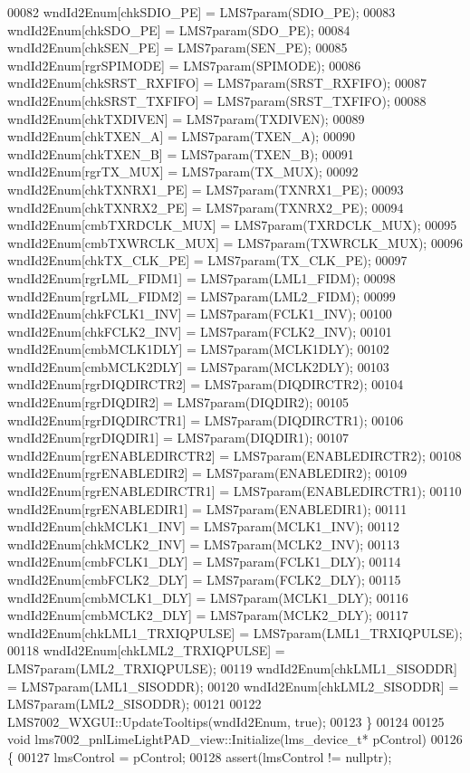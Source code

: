 \begin{DoxyCode}
00082     wndId2Enum[chkSDIO_PE] = LMS7param(SDIO_PE);
00083     wndId2Enum[chkSDO_PE] = LMS7param(SDO_PE);
00084     wndId2Enum[chkSEN_PE] = LMS7param(SEN_PE);
00085     wndId2Enum[rgrSPIMODE] = LMS7param(SPIMODE);
00086     wndId2Enum[chkSRST_RXFIFO] = LMS7param(SRST_RXFIFO);
00087     wndId2Enum[chkSRST_TXFIFO] = LMS7param(SRST_TXFIFO);
00088     wndId2Enum[chkTXDIVEN] = LMS7param(TXDIVEN);
00089     wndId2Enum[chkTXEN_A] = LMS7param(TXEN_A);
00090     wndId2Enum[chkTXEN_B] = LMS7param(TXEN_B);
00091     wndId2Enum[rgrTX_MUX] = LMS7param(TX_MUX);
00092     wndId2Enum[chkTXNRX1_PE] = LMS7param(TXNRX1_PE);
00093     wndId2Enum[chkTXNRX2_PE] = LMS7param(TXNRX2_PE);
00094     wndId2Enum[cmbTXRDCLK_MUX] = LMS7param(TXRDCLK_MUX);
00095     wndId2Enum[cmbTXWRCLK_MUX] = LMS7param(TXWRCLK_MUX);
00096     wndId2Enum[chkTX_CLK_PE] = LMS7param(TX_CLK_PE);
00097     wndId2Enum[rgrLML_FIDM1] = LMS7param(LML1_FIDM);
00098     wndId2Enum[rgrLML_FIDM2] = LMS7param(LML2_FIDM);
00099     wndId2Enum[chkFCLK1_INV] = LMS7param(FCLK1_INV);
00100     wndId2Enum[chkFCLK2_INV] = LMS7param(FCLK2_INV);
00101     wndId2Enum[cmbMCLK1DLY] = LMS7param(MCLK1DLY);
00102     wndId2Enum[cmbMCLK2DLY] = LMS7param(MCLK2DLY);
00103     wndId2Enum[rgrDIQDIRCTR2] = LMS7param(DIQDIRCTR2);
00104     wndId2Enum[rgrDIQDIR2] = LMS7param(DIQDIR2);
00105     wndId2Enum[rgrDIQDIRCTR1] = LMS7param(DIQDIRCTR1);
00106     wndId2Enum[rgrDIQDIR1] = LMS7param(DIQDIR1);
00107     wndId2Enum[rgrENABLEDIRCTR2] = LMS7param(ENABLEDIRCTR2);
00108     wndId2Enum[rgrENABLEDIR2] = LMS7param(ENABLEDIR2);
00109     wndId2Enum[rgrENABLEDIRCTR1] = LMS7param(ENABLEDIRCTR1);
00110     wndId2Enum[rgrENABLEDIR1] = LMS7param(ENABLEDIR1);
00111     wndId2Enum[chkMCLK1_INV] = LMS7param(MCLK1\_INV);
00112     wndId2Enum[chkMCLK2_INV] = LMS7param(MCLK2\_INV);
00113     wndId2Enum[cmbFCLK1_DLY] = LMS7param(FCLK1\_DLY);
00114     wndId2Enum[cmbFCLK2_DLY] = LMS7param(FCLK2\_DLY);
00115     wndId2Enum[cmbMCLK1_DLY] = LMS7param(MCLK1\_DLY);
00116     wndId2Enum[cmbMCLK2_DLY] = LMS7param(MCLK2\_DLY);
00117     wndId2Enum[chkLML1_TRXIQPULSE] = LMS7param(LML1\_TRXIQPULSE);
00118     wndId2Enum[chkLML2_TRXIQPULSE] = LMS7param(LML2\_TRXIQPULSE);
00119     wndId2Enum[chkLML1_SISODDR] = LMS7param(LML1\_SISODDR);
00120     wndId2Enum[chkLML2_SISODDR] = LMS7param(LML2\_SISODDR);
00121 
00122     LMS7002_WXGUI::UpdateTooltips(wndId2Enum, \textcolor{keyword}{true});
00123 \}
00124 
00125 \textcolor{keywordtype}{void} lms7002_pnlLimeLightPAD_view::Initialize(lms_device_t* pControl)
00126 \{
00127     lmsControl = pControl;
00128     assert(lmsControl != \textcolor{keyword}{nullptr});

\end{DoxyCode}
